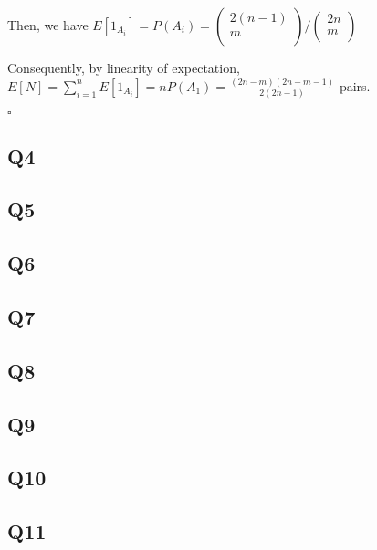 \documentclass[12pt]{article}
\begin{document}
Then, we have  \(E[1_{A_i}] = P(A_i) = \begin{pmatrix}
     2(n-1) \\
     m \\
\end{pmatrix} / \begin{pmatrix}
     2n \\
     m \\
\end{pmatrix}\)

Consequently, by linearity of expectation,\\
\(E[N] = \sum_{i=1}^{n}E[1_{A_i}] = nP(A_1) = \frac{(2n-m)(2n-m-1)}{2(2n-1)}\) pairs.    

\hspace{\textwidth}\(\square\) 
\subsection*{Q4}

\subsection*{Q5}
\subsection*{Q6}
\subsection*{Q7}
\subsection*{Q8}
\subsection*{Q9}
\subsection*{Q10}
\subsection*{Q11}
\end{document}
